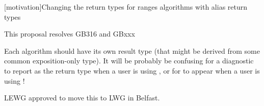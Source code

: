 [motivation]{Changing the return types for ranges algorithms with alias return types}

This proposal resolves GB316 and GBxxx

Each algorithm should have its own result type (that might be derived from some common
exposition-only type). It will be probably be confusing for a diagnostic to report
 as the return type when a user is using , or for
 to appear when a user is using !

LEWG approved to move this to LWG in Belfast.
